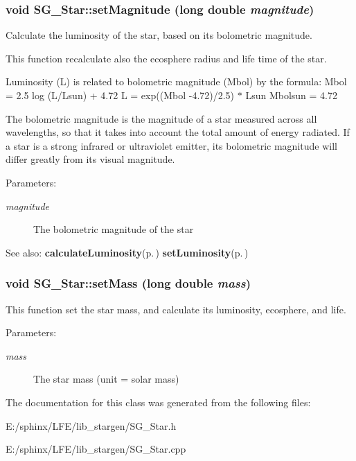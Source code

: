 \subsubsection{\setlength{\rightskip}{0pt plus 5cm}void SG\_\-Star::set\-Magnitude (long double {\em magnitude})}\label{class_s_g___star_a8}


Calculate the luminosity of the star, based on its bolometric magnitude. 

This function recalculate also the ecosphere radius and life time of the star.

Luminosity (L) is related to bolometric magnitude (Mbol) by the formula: Mbol = 2.5 log (L/Lsun) + 4.72 L = exp((Mbol -4.72)/2.5) $\ast$ Lsun Mbolsun = 4.72

The bolometric magnitude is the magnitude of a star measured across all wavelengths, so that it takes into account the total amount of energy radiated. If a star is a strong infrared or ultraviolet emitter, its bolometric magnitude will differ greatly from its visual magnitude.

\begin{Desc}
\item[Parameters:]
\begin{description}
\item[{\em magnitude}]The bolometric magnitude of the star \end{description}
\end{Desc}
\begin{Desc}
\item[See also:]{\bf calculate\-Luminosity}{\rm (p.\,\pageref{class_s_g___star_b0})} {\bf set\-Luminosity}{\rm (p.\,\pageref{class_s_g___star_a4})} \end{Desc}
\subsubsection{\setlength{\rightskip}{0pt plus 5cm}void SG\_\-Star::set\-Mass (long double {\em mass})}\label{class_s_g___star_a3}


This function set the star mass, and calculate its luminosity, ecosphere, and life. 

\begin{Desc}
\item[Parameters:]
\begin{description}
\item[{\em mass}]The star mass (unit = solar mass) \end{description}
\end{Desc}


The documentation for this class was generated from the following files:\begin{CompactItemize}
\item 
E:/sphinx/LFE/lib\_\-stargen/SG\_\-Star.h\item 
E:/sphinx/LFE/lib\_\-stargen/SG\_\-Star.cpp\end{CompactItemize}
